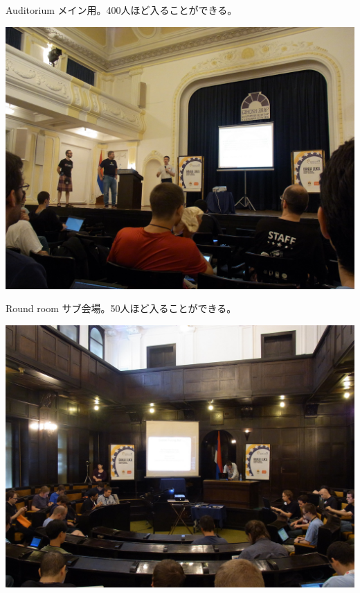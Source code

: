 \begin{frame}{Auditorium} 
メイン用。400人ほど入ることができる。\\
\begin{center}
\includegraphics[width=0.9\hsize]{image201108/debconf11_main.jpg}
\end{center}
\end{frame}

\begin{frame}{Round room} 
サブ会場。50人ほど入ることができる。\\
\begin{center}
\includegraphics[width=0.9\hsize]{image201108/debconf11_room2.jpg}
\end{center}
\end{frame}

